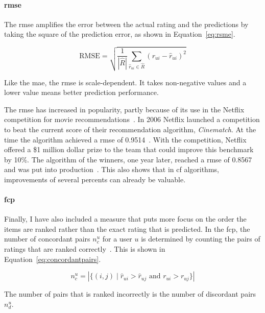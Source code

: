 \paragraph{\gls{rmse}}
The \gls{rmse} amplifies the error between the actual rating and the predictions by taking the square of the prediction error, as shown in Equation~\ref{eq:rsme}.

\begin{equation}
    \label{eq:rsme}
    \text{RMSE} = \sqrt{ \frac{1}{ |\hat{R}| }  \sum\limits_{\hat{r}_{ui} \in \hat{R}} (r_{ui} - \hat{r}_{ui})^2}
\end{equation}

Like the \gls{mae}, the \gls{rmse} is scale-dependent.
It takes non-negative values and a lower value means better prediction performance.

The \gls{rmse} has increased in popularity, partly because of its use in the Netflix competition for movie recommendations~\cite{su2009survey,zhou2008large}.
In 2006 Netflix launched a competition to beat the current score of their recommendation algorithm, \emph{Cinematch}.
At the time the algorithm achieved a \gls{rmse} of 0.9514~\cite{zhou2008large,bennett2007netflix}.
With the competition, Netflix offered a \$1 million dollar prize to the team that could improve this benchmark by 10\%.
The algorithm of the winners, one year later, reached a \gls{rmse} of 0.8567 and was put into production~\cite{zhou2008large,netflixprizeforum,netflixprizeleaderboard}.
This also shows that in \gls{cf} algorithms, improvements of several percents can already be valuable.

\paragraph{\gls{fcp}}
Finally, I have also included a measure that puts more focus on the order the items are ranked rather than the exact rating that is predicted.
In the \gls{fcp}, the number of concordant pairs $n_{c}^{u}$ for a user $u$ is determined by counting the pairs of ratings that are ranked correctly~\cite{koren2013collaborative}.
This is shown in Equation~\ref{eq:concordantpairs}.

\begin{equation}
    \label{eq:concordantpairs}
    n_{c}^{u} = |\{(i,j) \mid \hat{r}_{ui} > \hat{r}_{uj} \text{ and } r_{ui} > r_{uj} \}|
\end{equation}

The number of pairs that is ranked incorrectly is the number of discordant pairs $n_{d}^u$.


